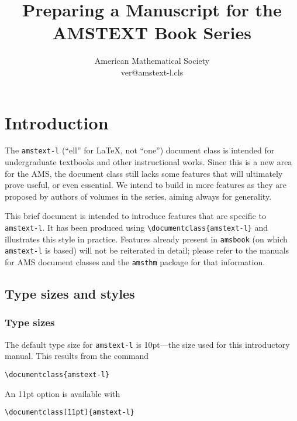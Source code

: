 \documentclass[multixcb]{amstext-l}
\theoremstyle{plain}
\theoremstyle{definition}
\newcommand{\cls}[1]{\texttt{#1}}
\newcommand{\pkg}[1]{\texttt{#1}}
\newenvironment{exm}{%
  \par
  \begingroup
    \parindent0pt
    \leftskip2\normalparindent
    \obeylines
}{%
    \par
  \endgroup
}
\begin{document}
\frontmatter

\makeatletter
\def\currversion{\csname ver@amstext-l.cls\endcsname}
\makeatother

\title{Preparing a Manuscript for the\\ AMSTEXT Book Series}
\author{American Mathematical Society\\[12pt]
        \smaller \currversion}

\maketitle

\tableofcontents

\mainmatter

\chapter{Introduction}

The \cls{amstext-l} (``ell'' for \LaTeX, not ``one'') document class
is intended for undergraduate textbooks and other instructional works.
Since this is a new area for the AMS, the document class still lacks
some features that will ultimately prove useful, or even essential.  We
intend to build in more features as they are proposed by authors of
volumes in the series, aiming always for generality.

This brief document is intended to introduce features that are
specific to \cls{amstext-l}.  It has been produced using
\verb+\documentclass{amstext-l}+ and illustrates this style in
practice.  Features already present in \cls{amsbook} (on which
\cls{amstext-l} is based) will not be reiterated in detail;
please refer to the manuals for AMS document classes \cite{HANDBK}
and the \pkg{amsthm} package \cite{THM} for that information.

\section{Type sizes and styles}

\subsection{Type sizes}

The default type size for \cls{amstext-l} is 10pt---the size
used for this introductory manual.  This results from the command
\begin{exm}
\verb+\documentclass{amstext-l}+
\end{exm}
\noindent
An 11pt option is available with
\begin{exm}
\verb+\documentclass[11pt]{amstext-l}+
\end{exm}
\end{document}
